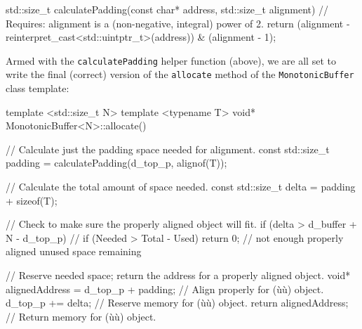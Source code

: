 \begin{emcppslisting}
std::size_t calculatePadding(const char* address, std::size_t alignment)
    // Requires: alignment is a (non-negative, integral) power of 2.
{
    return (alignment - reinterpret_cast<std::uintptr_t>(address)) & 
           (alignment - 1);
}
\end{emcppslisting}
    
\noindent Armed with the
\lstinline!calculatePadding! helper function (above), we are all set to write the final (correct) version of the \lstinline!allocate! method of the \lstinline!MonotonicBuffer! class template:

\begin{emcppslisting}
template <std::size_t N>                                                        
template <typename T>
void* MonotonicBuffer<N>::allocate()
{
    // Calculate just the padding space needed for alignment.
    const std::size_t padding = calculatePadding(d_top_p, alignof(T));

    // Calculate the total amount of space needed.
    const std::size_t delta = padding + sizeof(T);

    // Check to make sure the properly aligned object will fit.
    if (delta > d_buffer + N - d_top_p)  // if (Needed > Total - Used)
    {
        return 0;  // not enough properly aligned unused space remaining
    }

    // Reserve needed space; return the address for a properly aligned object.
    void* alignedAddress = d_top_p + padding;  // Align properly for (ù{}ù) object.
    d_top_p += delta;                          // Reserve memory for (ù{}ù) object.
    return alignedAddress;                     // Return memory for (ù{}ù) object.
}
\end{emcppslisting}
    
